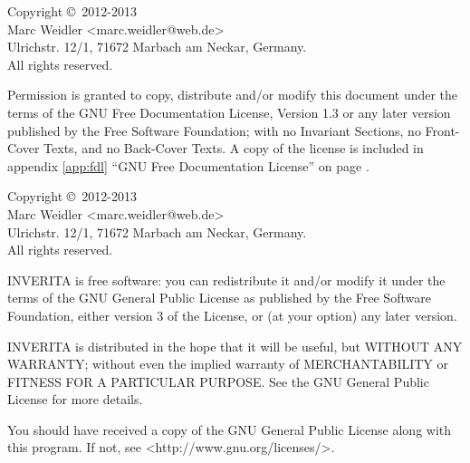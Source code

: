 Copyright \copyright\ 2012-2013\\
Marc Weidler <marc.weidler@web.de>\\
Ulrichstr. 12/1, 71672 Marbach am Neckar, Germany.\\
All rights reserved.

Permission is granted to copy, distribute and/or modify this document
under the terms of the GNU Free Documentation License, Version 1.3
or any later version published by the Free Software Foundation;
with no Invariant Sections, no Front-Cover Texts, and no Back-Cover Texts.
A copy of the license is included in appendix \ref{app:fdl} ``GNU Free Documentation License''
on page \pageref{app:fdl}.

Copyright \copyright\ 2012-2013\\
Marc Weidler <marc.weidler@web.de>\\
Ulrichstr. 12/1, 71672 Marbach am Neckar, Germany.\\
All rights reserved.

INVERITA is free software: you can redistribute it and/or modify
it under the terms of the GNU General Public License as published by
the Free Software Foundation, either version 3 of the License, or
(at your option) any later version.

INVERITA is distributed in the hope that it will be useful,
but WITHOUT ANY WARRANTY; without even the implied warranty of
MERCHANTABILITY or FITNESS FOR A PARTICULAR PURPOSE.  See the
GNU General Public License for more details.

You should have received a copy of the GNU General Public License
along with this program.  If not, see <http://www.gnu.org/licenses/>.
